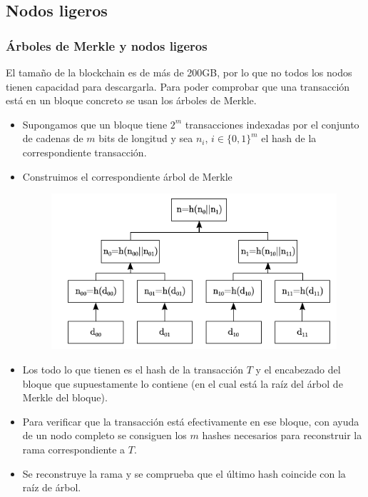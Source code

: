 \documentclass{beamer}
\theoremstyle{definition}
\begin{document}
\subsection{Nodos ligeros}
\begin{frame}
	\frametitle{Árboles de Merkle y nodos ligeros}
	El tamaño de la blockchain es de más de 200GB, por lo que no todos los nodos tienen capacidad para descargarla. Para poder comprobar que una transacción está en un bloque concreto se usan los árboles de Merkle.
	
	\begin{itemize}
		\item<2-> Supongamos que un bloque tiene $2^m$ transacciones indexadas por el conjunto de cadenas de $m$ bits de longitud y sea $n_i$, $i\in\{0,1\}^m$ el hash de la correspondiente transacción.
	\end{itemize}
\end{frame}

\begin{frame}
	\begin{itemize}
		\item<1-> Construimos el correspondiente árbol de Merkle
		\begin{figure}
			\includegraphics[scale=0.6]{merkle}
		\end{figure}
	\end{itemize}
\end{frame}

\begin{frame}
	\begin{itemize}
		\item<1-> Los  todo lo que tienen es el hash de la transacción $T$ y el encabezado del bloque que supuestamente lo contiene (en el cual está la raíz del árbol de Merkle del bloque).
		\item<2-> Para verificar que la transacción está efectivamente en ese bloque, con ayuda de un nodo completo se consiguen los $m$ hashes necesarios para reconstruir la rama correspondiente a $T$.
		\item<3-> Se reconstruye la rama y se comprueba que el último hash coincide con la raíz de árbol.
	\end{itemize}
\end{frame}
\end{document}
